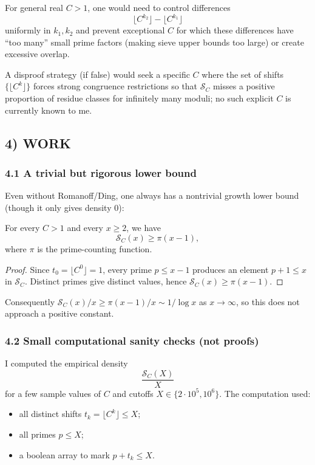 For general real $C>1$, one would need to control differences
\[
\lfloor C^{k_2}\rfloor-\lfloor C^{k_1}\rfloor
\]
uniformly in $k_1,k_2$ and prevent exceptional $C$ for which these differences have ``too many'' small prime factors (making sieve upper bounds too large) or create excessive overlap.

A disproof strategy (if false) would seek a specific $C$ where the set of shifts $\{\lfloor C^k\rfloor\}$ forces strong congruence restrictions so that $\mathcal{S}_C$ misses a positive proportion of residue classes for infinitely many moduli; no such explicit $C$ is currently known to me.

\subsection*{4) WORK}
\subsubsection*{4.1 A trivial but rigorous lower bound}
Even without Romanoff/Ding, one always has a nontrivial growth lower bound (though it only gives density $0$):

\begin{lemma}[Uniform lower bound from the $k=0$ shift]
For every $C>1$ and every $x\ge 2$, we have
\[
\mathcal{S}_C(x)\ge \pi(x-1),
\]
where $\pi$ is the prime-counting function.
\end{lemma}

\begin{proof}
Since $t_0=\lfloor C^0\rfloor=1$, every prime $p\le x-1$ produces an element $p+1\le x$ in $\mathcal{S}_C$. Distinct primes give distinct values, hence $\mathcal{S}_C(x)\ge \pi(x-1)$.
\end{proof}

Consequently $\mathcal{S}_C(x)/x \ge \pi(x-1)/x \sim 1/\log x$ as $x\to\infty$, so this does not approach a positive constant.

\subsubsection*{4.2 Small computational sanity checks (not proofs)}
I computed the empirical density
\[
\frac{\mathcal{S}_C(X)}{X}
\]
for a few sample values of $C$ and cutoffs $X\in\{2\cdot 10^5,10^6\}$. The computation used:
\begin{itemize}[leftmargin=2em]
\item all distinct shifts $t_k=\lfloor C^k\rfloor\le X$;
\item all primes $p\le X$;
\item a boolean array to mark $p+t_k\le X$.
\end{itemize}

